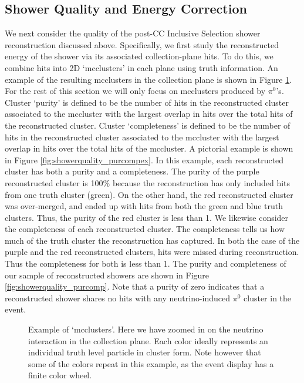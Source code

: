 \subsection{Shower Quality and Energy Correction}
We next consider the quality of the post-CC Inclusive Selection shower reconstruction discussed above.  Specifically, we first study the reconstructed energy of the shower via its associated collection-plane hits. To do this, we combine hits into 2D `mcclusters' in each plane using truth information.  An example of the resulting mcclusters in the collection plane is shown in Figure \ref{fig:mcclusters}. For the rest of this section we will only focus on mcclusters produced by $\pi^0$'s. Cluster `purity' is defined to be the number of hits in the reconstructed cluster associated to the mccluster with the largest overlap in hits over the total hits of the reconstructed cluster. Cluster `completeness' is defined to be the number of hits in the reconstructed cluster associated to the mccluster with the largest overlap in hits over the total hits of the mccluster. A pictorial example is shown in Figure \ref{fig:showerquality_purcompex}. In this example, each reconstructed cluster has both a purity and a completeness.  The purity of the purple reconstructed cluster is 100\% because the reconstruction has only included hits from one truth cluster (green). On the other hand, the red reconstructed cluster was over-merged, and ended up with hits from both the green and blue truth clusters.  Thus, the purity of the red cluster is less than 1. We likewise consider the completeness of each reconstructed cluster. The completeness tells us how much of the truth cluster the reconstruction has captured.  In both the case of the purple and the red reconstructed clusters, hits were missed during reconstruction. Thus the completeness for both is less than 1.  The purity and completeness of our sample of reconstructed showers are shown in Figure \ref{fig:showerquality_purcomp}. Note that a purity of zero indicates that a reconstructed shower shares no hits with any neutrino-induced $\pi^0$ cluster in the event. 

\begin{figure}[h!]
\centering
{}
\caption{ Example of `mcclusters'. Here we have zoomed in on the neutrino interaction in the collection plane. Each color ideally represents an individual truth level particle in cluster form. Note however that some of the colors repeat in this example, as the event display has a finite color wheel. }
\label{fig:mcclusters}
\end{figure}


